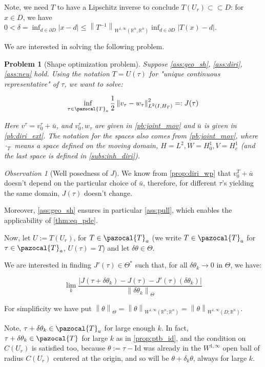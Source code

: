 \documentclass[english,a4paper,10pt,oneside]{scrbook}	%
\theoremstyle{break}
\newtheorem{pb}[equation]{Problem}
\theoremstyle{remark}
\newtheorem{obs}[equation]{Observation}
\newcommand{\mR}{\mathbb{R}}
\newcommand{\norm}[1]{\left\lVert#1\right\rVert}
\newcommand{\cc}{\subset\subset}
\newcommand{\cT}{\pazocal{T}}
\newcommand{\id}{\text{Id}}
\newcommand{\te}{\theta}
\newcommand{\Te}{\Theta}
\begin{document}
Note, we need $T$ to have a Lipschitz inverse to conclude $T(U_r)\cc D$: for $x \in D$, we have $0<\delta = \inf_{d \in \partial D}|x-d|\leq \norm{T^{-1}}_{W^{1,\infty}(\mR^n,\mR^n)}\inf_{d \in \partial D}|T(x)-d|$.

We are interested in solving the following problem.

\begin{pb}[Shape optimization problem]
\label{pb:shopt}
Suppose \cref{ass:geo_sh}, \cref{ass:diri}, \cref{ass:neu} hold. Using the notation $T = U(\tau)$ for "unique continuous representative" of $\tau$, we want to solve:

$$\inf_{\tau \in \cT_a}\frac{1}{2}\norm{v_\tau-w_\tau}_{L^2(I,H_T)}^2=:J(\tau)$$

Here $v^\tau = v_0^\tau + \bar{u}$, and $v_0^\tau, w_\tau$ are given in \cref{pb:joint_mov} and $\bar{u}$ is given in \cref{pb:diri_ext}. The notation for the spaces also comes from  \cref{pb:joint_mov}, where $\cdot_T$ means a space defined on the moving domain, $H=L^2, W=H^1_0, V = H^1_c$ (and the last space is defined in \cref{subs:inh_diri}).

\end{pb}

\begin{obs}[Well posedness of $J$]

We know from \cref{prop:diri_wp} that $v_0^T + \bar{u}$ doesn't depend on the particular choice of $\bar{u}$, therefore, for different $\tau$'s yielding the same domain, $J(\tau)$ doesn't change.

\end{obs}

Moreover, \cref{ass:geo_sh} ensures in particular \cref{ass:pull}, which enables the applicability of \cref{thm:eq_pde}.

Now, let $U:=T(U_r)$, for $T \in \cT_a$ (we write $T \in \cT_a$ for $\tau \in \cT_a$, $U(\tau)=T$) and let $\delta \te \in \Te$. 

We are interested in finding $J'(\tau) \in \Te^*$ such that, for all $\delta \te_k \rightarrow 0$ in $\Te$, we have:


$$\lim_{k}\frac{|J(\tau+\delta \te_k)-J(\tau)-J'(\tau)(\delta \te_k)|}{\norm{\delta \te_k}_{\Te}}$$

For simplificity we have put $\norm{\te}_\Te = \norm{\te}_{W^{1,\infty}(\mR^n;\mR^n)}=\norm{\te}_{W^{1,\infty}(D;\mR^n)}$.

Note, $\tau+\delta \te_k \in \cT_a$ for large enough $k$. In fact, $\tau+\delta \te_k \in \cT$ for large $k$ as in \cref{prop:ptb_id}, and the condition on $C(U_r)$ is satisfied too, because $\te :=\tau-\id$ was already in the $W^{1,\infty}$ open ball of radius $C(U_r)$ centered at the origin, and so will be $\te + \delta_k\te$, always for large $k$.
\end{document}
